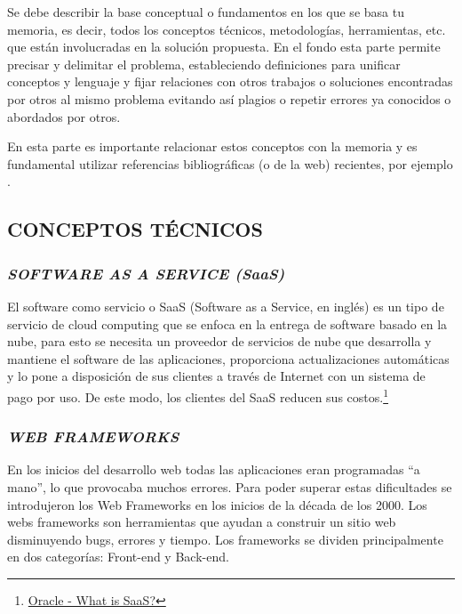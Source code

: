 
Se debe describir la base conceptual o fundamentos en los que se basa tu memoria, es decir, todos los conceptos técnicos, metodologías, herramientas, etc. que están involucradas en la solución propuesta. En el fondo esta parte permite precisar y delimitar el problema, estableciendo definiciones para unificar conceptos y lenguaje y fijar relaciones con otros trabajos o soluciones encontradas por otros al mismo problema evitando así plagios o repetir errores ya conocidos o abordados por otros.

En esta parte es importante relacionar estos conceptos con la memoria y es fundamental utilizar referencias bibliográficas (o de la web) recientes, por ejemplo \cite{gettelfinger2004will}.

\subsection{CONCEPTOS TÉCNICOS}

\subsubsection{\textit{SOFTWARE AS A SERVICE (SaaS)}} 

El software como servicio o SaaS (Software as a Service, en inglés) es un tipo de servicio de cloud computing que se enfoca en la entrega de software basado en la nube, para esto se necesita un proveedor de servicios de nube que desarrolla y mantiene el software de las aplicaciones, proporciona actualizaciones automáticas y lo pone a disposición de sus clientes a través de Internet con un sistema de pago por uso. De este modo, los clientes del SaaS reducen sus costos.\footnote{\href{https://www.oracle.com/applications/what-is-saas/}{Oracle - What is SaaS?}}

\subsubsection{\textit{WEB FRAMEWORKS}}

En los inicios del desarrollo web todas las aplicaciones eran programadas “a mano”, lo que provocaba muchos errores. Para poder superar estas dificultades se introdujeron los Web Frameworks en los inicios de la década de los 2000. Los webs frameworks son herramientas que ayudan a construir un sitio web disminuyendo bugs, errores y tiempo. Los frameworks se dividen principalmente en dos categorías: Front-end y Back-end. \cite{analysiswf} 

